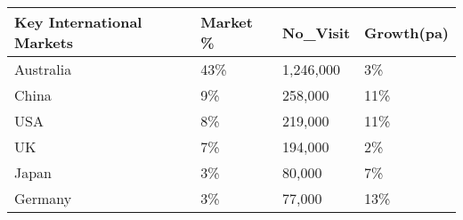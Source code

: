 \begin{tabular}[t]{|p{3cm}|p{1.3cm}|p{1.25cm}|p{1.3cm}|}
  \hline
Key International Markets & Market \% & No\_Visit & Growth(pa) \\ 
  \hline
Australia & 43\% & 1,246,000 & 3\% \\ 
  China & 9\% &   258,000 & 11\% \\ 
  USA & 8\% &   219,000 & 11\% \\ 
  UK & 7\% &   194,000 & 2\% \\ 
  Japan & 3\% &    80,000 & 7\% \\ 
  Germany & 3\% &    77,000 & 13\% \\ 
   \hline
\end{tabular}
